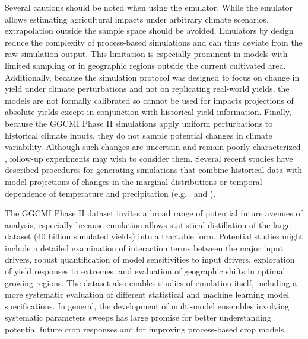 \documentclass[gmd, manuscript]{copernicus} %
\begin{document}
Several cautions should be noted when using the emulator. While the emulator allows estimating agricultural impacts under arbitrary climate scenarios, extrapolation outside the sample space should be avoided. 
Emulators by design reduce the complexity of process-based simulations and can thus deviate from the raw simulation output. This limitation is especially prominent in models with limited sampling or in geographic regions outside the current cultivated area.
Additionally, because the simulation protocol was designed to focus on change in yield under climate perturbations and not on replicating real-world yields, the models are not formally calibrated so cannot be used for impacts projections of absolute yields except in conjunction with historical yield information. 
Finally, because the GGCMI Phase II simulations apply uniform perturbations to historical climate inputs, they do not sample potential changes in climate variability. 
Although such changes are uncertain and remain poorly characterized \citep[e.g.][]{Alexande2006, Kodra2014}, follow-up experiments may wish to consider them. 
Several recent studies have described procedures for generating simulations that combine historical data with model projections of changes in the marginal distributions or temporal dependence of temperature and precipitation (e.g.\ \citet{Leeds2015, poppick2016, Won16} and \citet{Haugen2018}).

The GGCMI Phase II dataset invites a broad range of potential future avenues of analysis, especially because emulation allows statistical distillation of the large dataset (40 billion simulated yields) into a tractable form. 
Potential studies might include a detailed examination of interaction terms between the major input drivers, robust quantification of model sensitivities to input drivers, exploration of yield responses to extremes, and evaluation of geographic shifts in optimal growing regions. 
The dataset also enables studies of emulation itself, including a more systematic evaluation of different statistical and machine learning model specifications.
In general, the development of multi-model ensembles involving systematic parameters sweeps has large promise for better understanding potential future crop responses and for improving process-based crop models.

\end{document}
